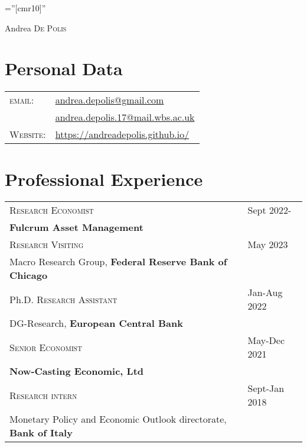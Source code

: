 \documentclass[a4paper,12pt]{article}
\begin{document}
\font\fb=''[cmr10]''

\par{\centering
		{\Huge Andrea \textsc{De Polis}
	}\par}

\section{Personal Data}
\renewcommand{\arraystretch}{0.75}
\begin{tabular}{ll}
        \textsc{email:}     & \href{mailto:andrea.depolis@gmail.com}{andrea.depolis@gmail.com}\\
                        & \href{mailto:andrea.depolis.17@mail.wbs.ac.uk}{andrea.depolis.17@mail.wbs.ac.uk} \\
    \textsc{Website:}   & \url{https://andreadepolis.github.io/}            
                        
\end{tabular}

\section{Professional Experience}
\begin{tabular*}{\linewidth}{@{}l@{\extracolsep{\fill}}l}
\textsc{Research Economist} & Sept 2022-\\
\textbf{Fulcrum Asset Management}\\[1em]
\textsc{Research Visiting} & May 2023 \\
Macro Research Group, \textbf{Federal Reserve Bank of Chicago}\\[1em]
Ph.D. \textsc{Research Assistant} & Jan-Aug 2022\\
DG-Research, \textbf{European Central Bank}\\[1em]
\textsc{Senior Economist} & May-Dec 2021\\
\textbf{Now-Casting Economic, Ltd}\\[1em]
\textsc{Research intern} & Sept-Jan 2018\\
Monetary Policy and Economic Outlook directorate, \textbf{Bank of Italy}
\end{tabular*}
\end{document}
